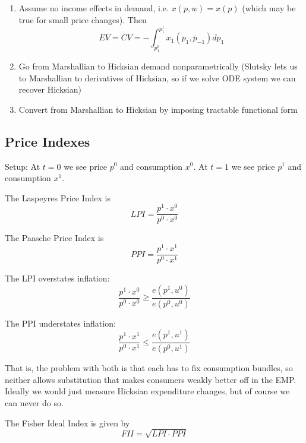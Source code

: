 \begin{enumerate}
\item Assume no income effects in demand, i.e. $x(p, w) = x(p)$ (which
  may be true for small price changes). Then
  \[
  EV = CV = -\int_{p_1^0}^{p_1^1} x_1(p_1, \bar p_{-1}) dp_1
  \]
\item Go from Marshallian to Hicksian demand nonparametrically
  (Slutsky lets us to Marshallian to derivatives of Hicksian, so if we
  solve ODE system we can recover Hicksian)
\item Convert from Marshallian to Hicksian by imposing tractable
  functional form
\end{enumerate}


\subsection{Price Indexes}
\label{sec:price-indexes}

Setup: At $t=0$ we see price $p^0$ and consumption $x^0$.  At $t=1$ we
see price $p^1$ and consumption $x^1$.

\begin{definition}
  The Laspeyres Price Index is 
  \[
  LPI = \frac{p^1 \cdot x^0}{p^0 \cdot x^0}
  \]
\end{definition}

\begin{definition}
  The Paasche Price Index is 
  \[
  PPI = \frac{p^1 \cdot x^1}{p^0 \cdot x^1}
  \]
\end{definition}

\begin{prop}
  The LPI overstates inflation:
  \[
  \frac{p^1 \cdot x^0}{p^0 \cdot x^0}
  \geq \frac{e(p^1, u^0)}{e(p^0, u^0)}
  \]

  The PPI understates inflation:
  \[
  \frac{p^1 \cdot x^1}{p^0 \cdot x^1}
  \leq \frac{e(p^1, u^1)}{e(p^0, u^1)}
  \]
\end{prop}

That is, the problem with both is that each has to fix consumption
bundles, so neither allows substitution that makes consumers weakly
better off in the EMP. Ideally we would just measure Hicksian
expenditure changes, but of course we can never do so.

\begin{definition}
  The Fisher Ideal Index is given by
  \[
  FII = \sqrt{ LPI \cdot PPI }
  \]
\end{definition}


